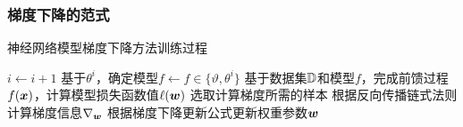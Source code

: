 \begin{frame}
    \frametitle{梯度下降的范式}

    \begin{algorithm}[H]
        \caption{神经网络模型梯度下降方法训练过程}
        \label{alg:ch.intro.gd}
        \begin{algorithmic}[1]
            \STATE \(i\leftarrow i+1\)
            \STATE 基于\(\theta^i\)，确定模型\(f \leftarrow  f \in \{\vartheta, \theta^i\}\)
            \STATE 基于数据集\(\mathbb{D}\)和模型\(f\)，完成前馈过程\(f(\bm{x})\)，计算模型损失函数值\(\ell({\bm{w}}) \)
            \STATE 选取计算梯度所需的样本
            \STATE 根据反向传播链式法则计算梯度信息\(\nabla_{\bm{w}}\)
            \STATE 根据梯度下降更新公式更新权重参数\(\bm{w}\)
            \ENDFOR
            \ENDWHILE
        \end{algorithmic}
    \end{algorithm}

\end{frame}

